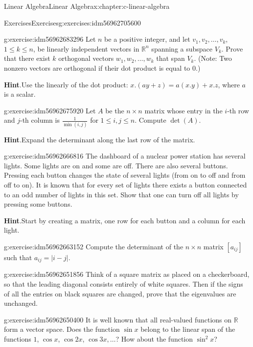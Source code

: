 \documentclass[twoside,10pt,]{book}
\newcommand{\blocktitlefont}{\relax}
\numberwithin{equation}{section}
\begin{document}
\begin{chapterptx}{Linear Algebra}{}{Linear Algebra}{}{}{x:chapter:c-linear-algebra}
\begin{exercises-section}{Exercises}{}{Exercises}{}{}{g:exercises:idm56962705600}
\begin{divisionexercise}{6}{}{}{g:exercise:idm56962683296}
Let \(n\) be a positive integer, and let \(v_1, v_2, \ldots ,v_k\), \(1\leq k\leq n\), be linearly independent vectors in \(\mathbb{R}^n\) spanning a subspace \(V_k\). Prove that there exist \(k\) orthogonal vectors \(w_1, w_2, \ldots ,w_k\) that span \(V_k\).  (Note: Two nonzero vectors are orthogonal if their dot product is equal to 0.)%
\par\smallskip%
\noindent\textbf{\blocktitlefont Hint}.\hypertarget{g:hint:idm56962681024}{}\quad{}Use the linearly of the dot product: \(x.(a y+z) = a(x.y)+x.z\), where \(a\) is a scalar.%
\end{divisionexercise}%
\begin{divisionexercise}{7}{}{}{g:exercise:idm56962675920}%
Let \(A\) be the \(n\times n\) matrix whose entry in the \(i\)-th row and \(j\)-th column is \(\frac{1}{\min (i,j)}\) for \(1 \leq  i,j \leq  n\). Compute \(\det (A)\).%
\par\smallskip%
\noindent\textbf{\blocktitlefont Hint}.\hypertarget{g:hint:idm56962675152}{}\quad{}Expand the determinant along the last row of the matrix.%
\end{divisionexercise}%
\begin{divisionexercise}{8}{}{}{g:exercise:idm56962666816}%
The dashboard of a nuclear power station has several lights. Some lights are on and some are off. There are also several buttons. Pressing each button changes the state of several lights (from on to off and from off to on). It is known that for every set of lights there exists a button connected to an odd number of lights in this set. Show that one can turn off all lights by pressing some buttons.%
\par\smallskip%
\noindent\textbf{\blocktitlefont Hint}.\hypertarget{g:hint:idm56962663888}{}\quad{}Start by creating a matrix, one row for each button and a column for each light.%
\end{divisionexercise}%
\begin{divisionexercise}{9}{}{}{g:exercise:idm56962663152}%
Compute the determinant of the \(n \times  n\) matrix \(\left[a_{i j}\right]\) such that \(a_{i j} =\lvert i-j\rvert\).%
\end{divisionexercise}%
\begin{divisionexercise}{10}{}{}{g:exercise:idm56962651856}%
Think of a square matrix as placed on a checkerboard, so that the leading diagonal consists entirely of white squares. Then if the signs of all the entries on black squares are changed, prove that the eigenvalues are unchanged.%
\end{divisionexercise}%
\begin{divisionexercise}{11}{}{}{g:exercise:idm56962650400}%
It is well known that all real-valued functions on \(\mathbb{R}\) form a vector space. Does the function \(\sin  x\) belong to the linear span of the functions \(1\), \(\cos x\), \(\cos 2 x\), \(\cos 3 x,\ldots\)?    How about the function \(\sin^2 x\)?%
\end{divisionexercise}%
\end{exercises-section}
\end{chapterptx}
\end{document}
